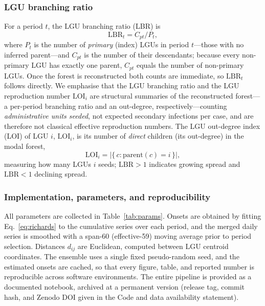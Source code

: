 \documentclass[a4paper,11pt]{article}
\begin{document}
\subsubsection{LGU branching ratio}
For a period $t$, the LGU branching ratio (LBR) is
\begin{equation}
\mathrm{LBR}_t = C_{pt}/P_t,
\label{eq:rt}
\end{equation}
where $P_t$ is the number of \emph{primary} (index) LGUs in period $t$---those with
no inferred parent---and $C_{pt}$ is the number of their descendants; because every
non-primary LGU has exactly one parent, $C_{pt}$ equals the number of non-primary
LGUs. Once the forest is reconstructed both counts are immediate, so $\mathrm{LBR}_t$
follows directly. We emphasise that the LGU branching ratio and the LGU reproduction
number $\mathrm{LOI}_i$ are structural summaries of the reconstructed forest---a per-period
branching ratio and an out-degree, respectively---counting \emph{administrative units
seeded}, not expected secondary infections per case, and are therefore not classical
effective reproduction numbers. The LGU out-degree index (LOI) of LGU $i$, $\mathrm{LOI}_i$, is its number of
\emph{direct} children (its out-degree) in the modal forest,
\begin{equation}
\mathrm{LOI}_i = \big|\{\, c : \mathrm{parent}(c) = i \,\}\big|,
\label{eq:rti}
\end{equation}
measuring how many LGUs $i$ seeds; $\mathrm{LBR}>1$ indicates growing spread and $\mathrm{LBR}<1$
declining spread.

\subsubsection{Implementation, parameters, and reproducibility}
All parameters are collected in Table~\ref{tab:params}. Onsets are obtained by
fitting Eq.~\ref{eq:richards} to the cumulative series over each period, and the
merged daily series is smoothed with a span-60 (effective-59) moving average prior
to period selection. Distances $d_{ij}$ are Euclidean, computed between LGU
centroid coordinates. The ensemble uses a single fixed pseudo-random seed, and the
estimated onsets are cached, so that every figure, table, and reported number is
reproducible across software environments. The entire pipeline is provided as a
documented notebook, archived at a permanent version (release tag, commit hash, and
Zenodo DOI given in the Code and data availability statement).
\end{document}
